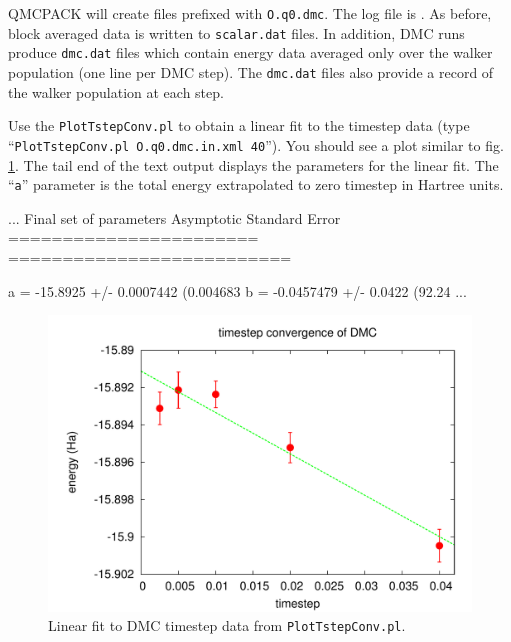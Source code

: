 QMCPACK will create files prefixed with \texttt{O.q0.dmc}.  The log file is .  As before, block averaged data is written to \texttt{scalar.dat} files.  In addition, DMC runs produce \texttt{dmc.dat} files which contain energy data averaged only over the walker population (one line per DMC step).  The \texttt{dmc.dat} files also provide a record of the walker population at each step.

Use the \texttt{PlotTstepConv.pl} to obtain a linear fit to the timestep data (type ``\texttt{PlotTstepConv.pl O.q0.dmc.in.xml 40}'').  You should see a plot similar to fig. \ref{fig:timestep_conv}.  The tail end of the text output displays the parameters for the linear fit.  The ``\texttt{a}'' parameter is the total energy extrapolated to zero timestep in Hartree units. 

\begin{shade}
...
Final set of parameters            Asymptotic Standard Error
=======================            ==========================

a               = -15.8925         +/- 0.0007442    (0.004683%
b               = -0.0457479       +/- 0.0422       (92.24%
...
\end{shade}

\begin{figure}
\begin{center}
\includegraphics[trim = 0mm 0mm 0mm 0mm, clip,width=0.75\columnwidth]{figures/lab_qmc_basics_timestep_conv.pdf}
\end{center}
\caption{Linear fit to DMC timestep data from \texttt{PlotTstepConv.pl}.}
\label{fig:timestep_conv}
\end{figure}


